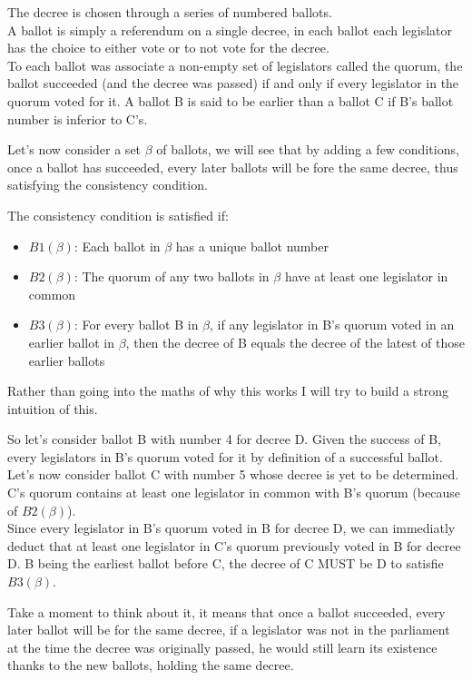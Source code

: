 \documentclass{article}
\begin{document}
The decree is chosen through a series of numbered ballots.\\
A ballot is simply a referendum on a single decree, in each ballot each legislator has the choice to either vote or to not vote for the decree.\\
To each ballot was associate a non-empty set of legislators called the quorum, the ballot succeeded (and the decree was passed) if and only if every legislator in the quorum voted for it.
A ballot B is said to be earlier than a ballot C if B's ballot number is inferior to C's.

Let's now consider a set ${\beta}$ of ballots, we will see that by adding a few conditions, once a ballot has succeeded, every later ballots will be fore the same decree, thus satisfying the consistency condition.

The consistency condition is satisfied if:
\begin{itemize}
    \item $B1(\beta)$: Each ballot in $\beta$ has a unique ballot number
    \item $B2(\beta)$: The quorum of any two ballots in $\beta$ have at least one legislator in common
    \item $B3(\beta)$: For every ballot B in $\beta$, if any legislator in B's quorum voted in an earlier ballot in $\beta$, then the decree of B equals the decree of the latest of those earlier ballots
\end{itemize}

Rather than going into the maths of why this works I will try to build a strong intuition of this.

So let's consider ballot B with number 4 for decree D. Given the success of B, every legislators in B's quorum voted for it by definition of a successful ballot.\\
Let's now consider ballot C with number 5 whose decree is yet to be determined. C's quorum contains at least one legislator in common with B's quorum (because of $B2(\beta)$).\\
Since every legislator in B's quorum voted in B for decree D, we can immediatly deduct that at least one legislator in C's quorum previously voted in B for decree D. B being the earliest ballot before C, the decree of C MUST be D to satisfie $B3(\beta)$.

Take a moment to think about it, it means that once a ballot succeeded, every later ballot will be for the same decree, if a legislator was not in the parliament at the time the decree was originally passed, he would still learn its existence thanks to the new ballots, holding the same decree.
\end{document}
